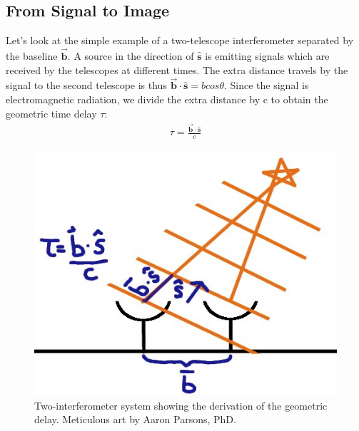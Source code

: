 \documentclass{article}
\begin{document}
\subsection{From Signal to Image}
Let's look at the simple example of a two-telescope interferometer
separated by the baseline $\overrightarrow{\textbf{b}}$. A source in the
direction of $\hat{\textbf{s}}$ is emitting signals which are received 
by the telescopes at different times. The extra distance travels by the
signal to the second telescope is thus $\overrightarrow{\textbf{b}}
\cdot \hat{\textbf{s}} = bcos\theta$. Since the signal is
electromagnetic radiation, we divide the extra distance by c to obtain
the geometric time delay $\tau$:
\begin{align}\tau = \frac{\overrightarrow{\textbf{b}}
\cdot \hat{\textbf{s}}}{c}
\end{align}
\begin{figure}[!h]
\centering
\includegraphics[width = .5\textwidth]{geometric_delay.png}
\caption{Two-interferometer system showing the derivation of the
  geometric delay. Meticulous art by Aaron Parsons, PhD.}
\end{figure}
\end{document}
